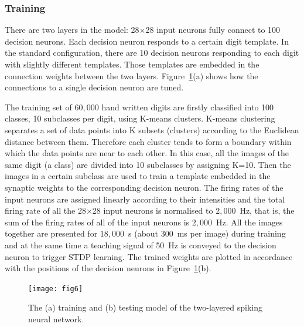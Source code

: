 \documentclass{frontiersENG} %
\begin{document}
\subsubsection{Training}
There are two layers in the model: 28$\times$28 input neurons fully connect to 100 decision neurons.
Each decision neuron responds to a certain digit template.
In the standard configuration, there are 10 decision neurons responding to each digit with slightly different templates.
Those templates are embedded in the connection weights between the two layers.
Figure~\ref{fig:model}(a) shows how the connections to a single decision neuron are tuned.

The training set of $60,000$ hand written digits are firstly classified into 100 classes, 10 subclasses per digit, using K-means clusters.
K-means clustering separates a set of data points into K subsets (clusters) according to the Euclidean distance between them.
Therefore each cluster tends to form a boundary within which the data points are near to each other.
In this case, all the images of the same digit (a class) are divided into 10 subclasses by assigning K=10.
Then the images in a certain subclass are used to train a template embedded in the synaptic weights to the corresponding decision neuron.
The firing rates of the input neurons are assigned linearly according to their intensities and the total firing rate of all the 28$\times$28 input neurons is normalised to $2,000$~Hz, that is, the sum of the firing rates of all of the input neurons is $2,000$~Hz.
All the images together are presented for $18,000$~s (about 300~ms per image) during training and at the same time a teaching signal of 50~Hz is conveyed to the decision neuron to trigger STDP learning.
The trained weights are plotted in accordance with the positions of the decision neurons in Figure~\ref{fig:model}(b).

\begin{figure}[thb!]
	\centering
%	
%	
	\texttt{[image: fig6]}
	\caption{The (a) training and (b) testing model of the two-layered spiking neural network.}
	\label{fig:model}
\end{figure} 
\end{document}
